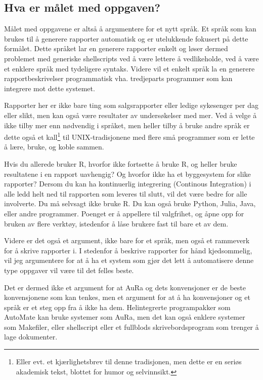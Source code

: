 \documentclass[11pt]{article}
\begin{document}
\subsection{Hva er målet med oppgaven?}



Målet med oppgavene er altså å argumentere for et nytt språk. Et språk som kan brukes til å generere rapporter automatisk og er utelukkende fokusert på dette formålet. Dette språket lar en generere rapporter enkelt og løser dermed problemet med generiske shellscripts ved å være lettere å vedlikeholde, ved å være et enklere språk med tydeligere syntaks. Videre vil et enkelt språk la en generere rapportbeskrivelser programmatisk vha. tredjeparts programmer som kan integrere mot dette systemet.



Rapporter her er ikke bare ting som salgsrapporter eller ledige sykesenger per dag eller slikt, men kan også være resultater av undersøkelser med mer.
Ved å velge å ikke tilby mer enn nødvendig i språket, men heller tilby å bruke andre språk er dette også et kall\footnote{Eller evt. et kjærlighetsbrev til denne tradisjonen, men dette er en seriøs akademisk tekst, blottet for humor og selvinnsikt.} til UNIX-tradisjonene med flere små programmer som er lette å lære, bruke, og koble sammen.



Hvis du allerede bruker R, hvorfor ikke fortsette å bruke R, og heller bruke resultatene i en rapport uavhengig? Og hvorfor ikke ha et byggesystem for slike rapporter? Dersom du kan ha kontinuerlig integrering (Continous Integration) i alle ledd helt ned til rapporten som leveres til slutt, vil det være bedre for alle involverte. Du må selvsagt ikke bruke R. Du kan også bruke Python, Julia, Java, eller andre programmer. Poenget er å appellere til valgfrihet, og åpne opp for bruken av flere verktøy, istedenfor å låse brukere fast til bare et av dem.



Videre er det også et argument, ikke bare for et språk, men også et rammeverk for å skrive rapporter i. I stedenfor å beskrive rapporter for hånd kjedsommelig, vil jeg argumentere for at å ha et system som gjør det lett å automatisere denne type oppgaver vil være til det felles beste.



Det er dermed ikke et argument for at AuRa og dets konvensjoner er de beste konvensjonene som kan tenkes, men et argument for at å ha konvensjoner og et språk er et steg opp fra å ikke ha dem. Helintegrerte programpakker som AutoMate kan bruke systemer som AuRa, men det kan også enklere systemer som Makefiler, eller shellscript eller et fullblods skrivebordsprogram som trenger å lage dokumenter.
\end{document}
